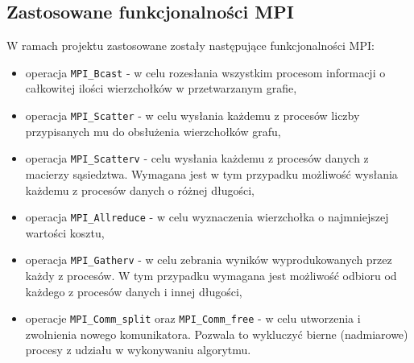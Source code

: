 \documentclass[12pt]{article}
\begin{document}
\subsection{Zastosowane funkcjonalności MPI}
W ramach projektu zastosowane zostały następujące funkcjonalności MPI:
\begin{itemize}
\item operacja \lstinline{MPI_Bcast} - w celu rozesłania wszystkim procesom informacji o całkowitej ilości wierzchołków w przetwarzanym grafie,
\item operacja \lstinline{MPI_Scatter} - w celu wysłania każdemu z procesów liczby przypisanych mu do obsłużenia wierzchołków grafu,
\item operacja \lstinline{MPI_Scatterv} - celu wysłania każdemu z procesów danych z macierzy sąsiedztwa. Wymagana jest w tym przypadku możliwość wysłania każdemu z procesów danych o różnej długości,
\item operacja \lstinline{MPI_Allreduce} - w celu wyznaczenia wierzchołka o najmniejszej wartości kosztu,
\item operacja \lstinline{MPI_Gatherv} - w celu zebrania wyników wyprodukowanych przez każdy z procesów. W tym przypadku wymagana jest możliwość odbioru od każdego z procesów danych i innej długości,
\item operacje \lstinline{MPI_Comm_split} oraz \lstinline{MPI_Comm_free} - w celu utworzenia i zwolnienia nowego komunikatora. Pozwala to wykluczyć bierne (nadmiarowe) procesy z udziału w wykonywaniu algorytmu.
\end{itemize}

\newpage
\end{document}
